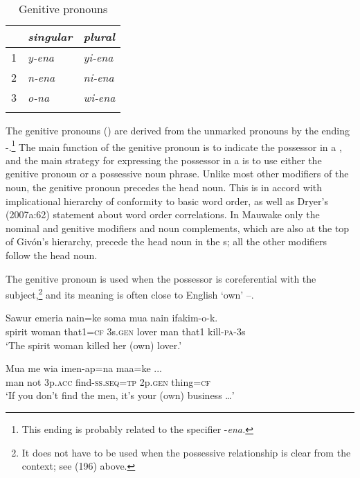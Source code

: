 \begin{table}
\caption{Genitive pronouns}
\label{tab:3:genitivepron}
 
\begin{tabular}{l>{\itshape}l>{\itshape}l}
\mytoprule
 &\upshape singular &\upshape plural\\
\midrule
1 &y-ena &yi-ena\\
2 &n-ena &ni-ena\\
3 &o-na &wi-ena\\
\mybottomrule
\end{tabular}
\end{table}


The genitive pronouns () are derived from the unmarked pronouns by the ending \nobreakdash-.\footnote{This ending is probably related to the specifier -\textit{ena.}} The main function of the genitive pronoun is to indicate the possessor in a , and the main strategy for expressing the possessor in a  is to use either the genitive pronoun or a possessive noun phrase. Unlike most other modifiers of the noun, the genitive pronoun precedes the head noun. This is in accord with  implicational hierarchy of conformity to basic word order, as well as Dryer's (2007a:62) statement about word order correlations. In Mauwake only the nominal and genitive modifiers and noun complements, which are also at the top of Giv\'on's \citeyear{Givon1984} hierarchy, precede the head noun in the s; all the other modifiers follow the head noun.

The genitive pronoun is used when the possessor is coreferential with the subject,\footnote{It does not have to be used when the possessive relationship is clear from the context; see (196) above.} and its meaning is often close to English `own' --.

\ea%
\label{ex:3:x1805}
\gll Sawur emeria nain=ke  soma mua nain ifakim-o-k. \\
spirit woman that1=\textsc{cf} 3s.\textsc{gen} lover man that1 kill-\textsc{pa}-3s\\
\glt`The spirit woman killed her (own) lover.'
\z

\ea%
\label{ex:3:x1806}
\gll Mua me wia imen-ap=na  maa=ke ... \\
man not 3p.\textsc{acc} find-\textsc{ss}.\textsc{seq}=\textsc{tp} 2p.\textsc{gen} thing=\textsc{cf}\\
\glt`If you don't find the men, it's your (own) business {\dots}'
\z

